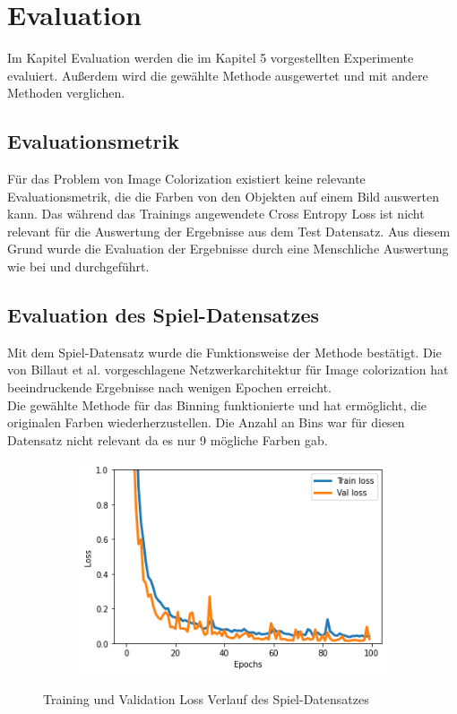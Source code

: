 \chapter{Evaluation}
\label{sec:evaluation}
Im Kapitel Evaluation werden die im Kapitel 5 vorgestellten Experimente evaluiert. Außerdem wird die gewählte Methode ausgewertet und
mit andere Methoden verglichen.

\section{Evaluationsmetrik}
Für das Problem von Image Colorization existiert keine relevante Evaluationsmetrik, die die Farben von den Objekten auf einem Bild auswerten kann.
Das während das Trainings angewendete Cross Entropy Loss ist nicht relevant für die Auswertung der Ergebnisse aus dem Test Datensatz. Aus diesem
Grund wurde die Evaluation der Ergebnisse durch eine Menschliche Auswertung wie bei \cite{zhang2016colorful} und \cite{billaut2018colorunet}
durchgeführt.

\section{Evaluation des Spiel-Datensatzes}
Mit dem Spiel-Datensatz wurde die Funktionsweise der Methode bestätigt. Die von Billaut et al. vorgeschlagene Netzwerkarchitektur für Image
colorization hat beeindruckende Ergebnisse nach wenigen Epochen erreicht. 
\\
Die gewählte Methode für das Binning funktionierte und hat ermöglicht, die originalen Farben wiederherzustellen. Die Anzahl an 
Bins war für diesen Datensatz nicht relevant da es nur 9 mögliche Farben gab.

\begin{figure}[H]
  \vspace{1cm}
  \centering
  \begin{subfigure}
    \centering
    \includegraphics[width=.5\textwidth]{resources/experiments/toy_100_324_0001.png}
  \end{subfigure}
  \caption{Training und Validation Loss Verlauf des Spiel-Datensatzes}
  \label{image:toy-dataset-loss}
\end{figure}

